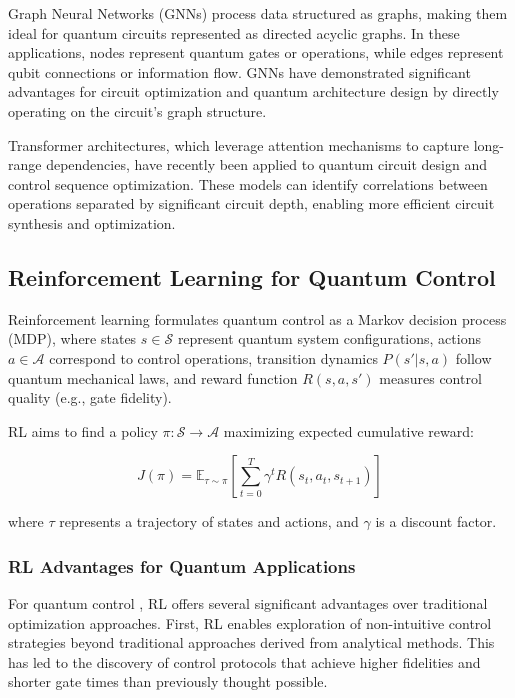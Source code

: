 Graph Neural Networks (GNNs) process data structured as graphs, making them ideal for quantum circuits represented as directed acyclic graphs. In these applications, nodes represent quantum gates or operations, while edges represent qubit connections or information flow. GNNs have demonstrated significant advantages for circuit optimization and quantum architecture design by directly operating on the circuit's graph structure.

Transformer architectures, which leverage attention mechanisms to capture long-range dependencies, have recently been applied to quantum circuit design and control sequence optimization. These models can identify correlations between operations separated by significant circuit depth, enabling more efficient circuit synthesis and optimization.

\subsection{Reinforcement Learning for Quantum Control}

Reinforcement learning formulates quantum control as a Markov decision process (MDP), where states $s \in \mathcal{S}$ represent quantum system configurations, actions $a \in \mathcal{A}$ correspond to control operations, transition dynamics $P(s'|s,a)$ follow quantum mechanical laws, and reward function $R(s,a,s')$ measures control quality (e.g., gate fidelity).

RL aims to find a policy $\pi: \mathcal{S} \rightarrow \mathcal{A}$ maximizing expected cumulative reward:

\begin{equation}
J(\pi) = \mathbb{E}_{\tau \sim \pi}\left[\sum_{t=0}^{T} \gamma^t R(s_t, a_t, s_{t+1})\right]
\end{equation}

where $\tau$ represents a trajectory of states and actions, and $\gamma$ is a discount factor.

\subsubsection{RL Advantages for Quantum Applications}

For quantum control \cite{bukov2018reinforcement}, RL offers several significant advantages over traditional optimization approaches. First, RL enables exploration of non-intuitive control strategies beyond traditional approaches derived from analytical methods. This has led to the discovery of control protocols that achieve higher fidelities and shorter gate times than previously thought possible.

